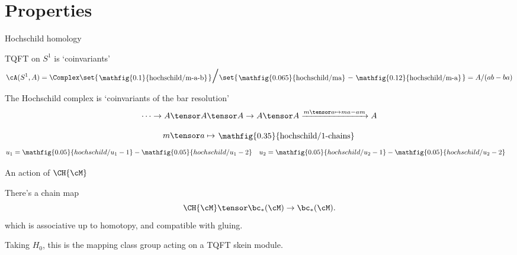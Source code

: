 \documentclass[beamer, compress]{beamer}
\begin{document}
\section{Properties}
\begin{frame}{Hochschild homology}
\begin{block}{TQFT on $S^1$ is `coinvariants'}
\vspace{-3mm}
$$\cA(S^1, A) = \Complex\set{\roundframe{\mathfig{0.1}{hochschild/m-a-b}}}\scalebox{2}{$/$}\set{\roundframe{\mathfig{0.065}{hochschild/ma}} - \roundframe{\mathfig{0.12}{hochschild/m-a}}} = A/(ab-ba)$$
\end{block}
\begin{block}{}
The Hochschild complex is `coinvariants of the bar resolution'
\vspace{-2mm}
$$ \cdots \to A \tensor A \tensor A \to A \tensor A \xrightarrow{m \tensor a \mapsto ma-am} A$$
\end{block}
\begin{thm}[$ \HC_*(A) \iso \bc_*(S^1; A)$]
$$m \tensor a \mapsto
\roundframe{\mathfig{0.35}{hochschild/1-chains}}
$$
\vspace{-5mm}
\begin{align*}
u_1 & = \mathfig{0.05}{hochschild/u_1-1} - \mathfig{0.05}{hochschild/u_1-2} & u_2  &= \mathfig{0.05}{hochschild/u_2-1} - \mathfig{0.05}{hochschild/u_2-2} 
\end{align*}
\end{thm}
\end{frame}

\begin{frame}{An action of $\CH{\cM}$}
\begin{thm}
There's a chain map
$$\CH{\cM} \tensor \bc_*(\cM) \to \bc_*(\cM).$$
which is associative up to homotopy, and compatible with gluing.
\end{thm}
\begin{block}{}
Taking $H_0$, this is the mapping class group acting on a TQFT skein module.
\end{block}
\end{frame}

\end{document}
